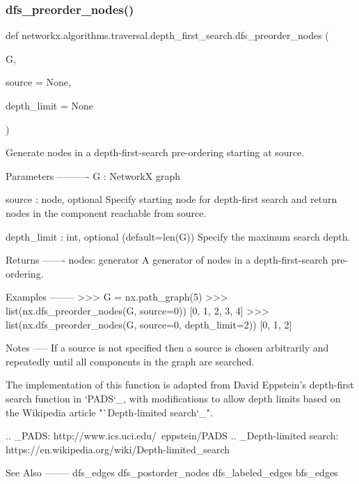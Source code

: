 \subsubsection{\texorpdfstring{dfs\+\_\+preorder\+\_\+nodes()}{dfs\_preorder\_nodes()}}
{\footnotesize\ttfamily def networkx.\+algorithms.\+traversal.\+depth\+\_\+first\+\_\+search.\+dfs\+\_\+preorder\+\_\+nodes (\begin{DoxyParamCaption}\item[{}]{G,  }\item[{}]{source = {\ttfamily None},  }\item[{}]{depth\+\_\+limit = {\ttfamily None} }\end{DoxyParamCaption})}

\begin{DoxyVerb}Generate nodes in a depth-first-search pre-ordering starting at source.

Parameters
----------
G : NetworkX graph

source : node, optional
   Specify starting node for depth-first search and return nodes in
   the component reachable from source.

depth_limit : int, optional (default=len(G))
   Specify the maximum search depth.

Returns
-------
nodes: generator
   A generator of nodes in a depth-first-search pre-ordering.

Examples
--------
>>> G = nx.path_graph(5)
>>> list(nx.dfs_preorder_nodes(G, source=0))
[0, 1, 2, 3, 4]
>>> list(nx.dfs_preorder_nodes(G, source=0, depth_limit=2))
[0, 1, 2]

Notes
-----
If a source is not specified then a source is chosen arbitrarily and
repeatedly until all components in the graph are searched.

The implementation of this function is adapted from David Eppstein's
depth-first search function in `PADS`_, with modifications
to allow depth limits based on the Wikipedia article
"`Depth-limited search`_".

.. _PADS: http://www.ics.uci.edu/~eppstein/PADS
.. _Depth-limited search: https://en.wikipedia.org/wiki/Depth-limited_search

See Also
--------
dfs_edges
dfs_postorder_nodes
dfs_labeled_edges
bfs_edges
\end{DoxyVerb}
 \mbox{\label{namespacenetworkx_1_1algorithms_1_1traversal_1_1depth__first__search_add384fc4710c29e79e99c392b08e898f}} 
